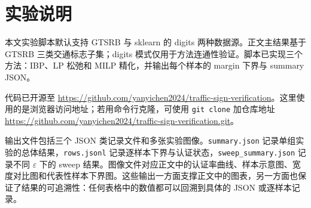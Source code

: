 \documentclass[11pt,a4paper]{ctexart}
\begin{document}



\clearpage
\appendix
\section{实验说明}
本文实验脚本默认支持 GTSRB 与 sklearn 的 digits 两种数据源。正文主结果基于 GTSRB 三类交通标志子集；digits 模式仅用于方法连通性验证。脚本已实现三个方法：IBP、LP 松弛和 MILP 精化，并输出每个样本的 margin 下界与 summary JSON。

代码已开源至 \url{https://github.com/yanyichen2024/traffic-sign-verification}。这里使用的是浏览器访问地址；若用命令行克隆，可使用 \texttt{git clone} 加仓库地址 \url{https://github.com/yanyichen2024/traffic-sign-verification.git}。

输出文件包括三个 JSON 类记录文件和多张实验图像。\texttt{summary.json} 记录单组实验的总体结果，\texttt{rows.jsonl} 记录逐样本下界与认证状态，\texttt{sweep\_summary.json} 记录不同 $\varepsilon$ 下的 sweep 结果。图像文件对应正文中的认证率曲线、样本示意图、宽度对比图和代表性样本下界图。这些输出一方面支撑正文中的图表，另一方面也保证了结果的可追溯性：任何表格中的数值都可以回溯到具体的 JSON 或逐样本记录。
\end{document}
